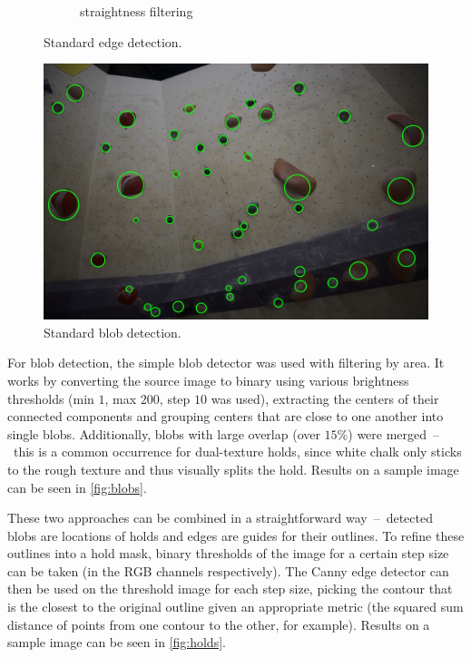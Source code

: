 \documentclass[final]{cvpr}
\begin{document}
\begin{figure}[t]
\begin{subfigure}{1\linewidth}
\caption{straightness filtering}
\label{fig:edges:c}
\end{subfigure}
\caption{Standard edge detection.}
\label{fig:edges}
\end{figure}

\begin{figure}[b]
\centering
\includegraphics[width = \linewidth]{img/blobs/3-blobs-merged.jpg}
\caption{Standard blob detection.}
\label{fig:blobs}
\end{figure}

For blob detection, the simple blob detector was used with filtering by area.
It works by converting the source image to binary using various brightness thresholds (min $1$, max $200$, step $10$ was used), extracting the centers of their connected components and grouping centers that are close to one another into single blobs.
Additionally, blobs with large overlap (over $15\%$) were merged~--~this is a common occurrence for dual-texture holds, since white chalk only sticks to the rough texture and thus visually splits the hold.
Results on a sample image can be seen in \autoref{fig:blobs}.

These two approaches can be combined in a straightforward way~--~detected blobs are locations of holds and edges are guides for their outlines.
To refine these outlines into a hold mask, binary thresholds of the image for a certain step size can be taken (in the RGB channels respectively).
The Canny edge detector can then be used on the threshold image for each step size, picking the contour that is the closest to the original outline given an appropriate metric (the squared sum distance of points from one contour to the other, for example).
Results on a sample image can be seen in \autoref{fig:holds}.
\end{document}
